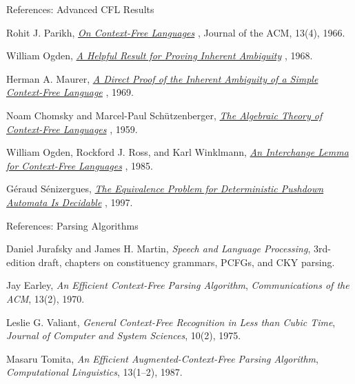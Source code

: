 \documentclass[10pt]{beamer}
\newcommand{\paperlink}[2]{%
  \href{#1}{\textcolor{blue!65!black}{#2}}%
}
\begin{document}
\begin{frame}{References: Advanced CFL Results}
  \scriptsize
  \begin{thebibliography}{9}
      Rohit J. Parikh,
      \newblock \paperlink{https://doi.org/10.1145/321356.321364}
      {\emph{On Context-Free Languages}},
      \newblock Journal of the ACM, 13(4), 1966.

      William Ogden,
      \newblock \paperlink{https://doi.org/10.1007/BF01694004}
      {\emph{A Helpful Result for Proving Inherent Ambiguity}}, 1968.

      Herman A. Maurer,
      \newblock \paperlink{https://doi.org/10.1145/321510.321517}
      {\emph{A Direct Proof of the Inherent Ambiguity of a Simple
      Context-Free Language}}, 1969.

      Noam Chomsky and Marcel-Paul Sch\"utzenberger,
      \newblock \paperlink{https://doi.org/10.1016/S0049-237X(09)70104-1}
      {\emph{The Algebraic Theory of Context-Free Languages}}, 1959.

      William Ogden, Rockford J. Ross, and Karl Winklmann,
      \newblock \paperlink{https://doi.org/10.1137/0214031}
      {\emph{An Interchange Lemma for Context-Free Languages}}, 1985.

      G\'eraud S\'enizergues,
      \newblock \paperlink{https://doi.org/10.1007/3-540-63165-8_221}
      {\emph{The Equivalence Problem for Deterministic Pushdown Automata Is
      Decidable}}, 1997.
  \end{thebibliography}
\end{frame}

\begin{frame}{References: Parsing Algorithms}
  \footnotesize
  \begin{thebibliography}{9}
      Daniel Jurafsky and James H. Martin,
      \newblock \emph{Speech and Language Processing}, 3rd-edition draft,
      \newblock chapters on constituency grammars, PCFGs, and CKY parsing.

      Jay Earley,
      \newblock \emph{An Efficient Context-Free Parsing Algorithm},
      \newblock \emph{Communications of the ACM}, 13(2), 1970.

      Leslie G. Valiant,
      \newblock \emph{General Context-Free Recognition in Less than Cubic Time},
      \newblock \emph{Journal of Computer and System Sciences}, 10(2), 1975.

      Masaru Tomita,
      \newblock \emph{An Efficient Augmented-Context-Free Parsing Algorithm},
      \newblock \emph{Computational Linguistics}, 13(1--2), 1987.
  \end{thebibliography}
\end{frame}
\end{document}
